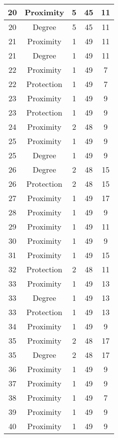 \documentclass[results.tex]{subfiles}
\begin{document}
\begin{center}
\begin{tabular}{| c || c | c | c | c |}
    20 & Proximity & 5 & 45 & 11 \\ 
    \hline
    20 & Degree & 5 & 45 & 11 \\ 
    \hline
    21 & Proximity & 1 & 49 & 11 \\ 
    \hline
    21 & Degree & 1 & 49 & 11 \\ 
    \hline
    22 & Proximity & 1 & 49 & 7 \\ 
    \hline
    22 & Protection & 1 & 49 & 7 \\ 
    \hline
    23 & Proximity & 1 & 49 & 9 \\ 
    \hline
    23 & Protection & 1 & 49 & 9 \\ 
    \hline
    24 & Proximity & 2 & 48 & 9 \\ 
    \hline
    25 & Proximity & 1 & 49 & 9 \\ 
    \hline
    25 & Degree & 1 & 49 & 9 \\ 
    \hline
    26 & Degree & 2 & 48 & 15 \\ 
    \hline
    26 & Protection & 2 & 48 & 15 \\ 
    \hline
    27 & Proximity & 1 & 49 & 17 \\ 
    \hline
    28 & Proximity & 1 & 49 & 9 \\ 
    \hline
    29 & Proximity & 1 & 49 & 11 \\ 
    \hline
    30 & Proximity & 1 & 49 & 9 \\ 
    \hline
    31 & Proximity & 1 & 49 & 15 \\ 
    \hline
    32 & Protection & 2 & 48 & 11 \\ 
    \hline
    33 & Proximity & 1 & 49 & 13 \\ 
    \hline
    33 & Degree & 1 & 49 & 13 \\ 
    \hline
    33 & Protection & 1 & 49 & 13 \\ 
    \hline
    34 & Proximity & 1 & 49 & 9 \\ 
    \hline
    35 & Proximity & 2 & 48 & 17 \\ 
    \hline
    35 & Degree & 2 & 48 & 17 \\ 
    \hline
    36 & Proximity & 1 & 49 & 9 \\ 
    \hline
    37 & Proximity & 1 & 49 & 9 \\ 
    \hline
    38 & Proximity & 1 & 49 & 7 \\ 
    \hline
    39 & Proximity & 1 & 49 & 9 \\ 
    \hline
    40 & Proximity & 1 & 49 & 9 \\ 

\end{tabular}
\end{center}
\end{document}
